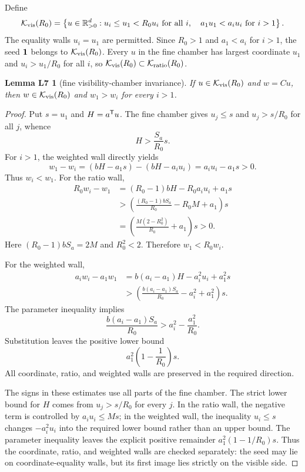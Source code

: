 \documentclass[11pt,letterpaper]{article}
\theoremstyle{plain}
\newtheorem*{lemLseven}{Lemma L7}
\begin{document}
Define
\[
\mathcal{K}_{\mathrm{vis}}(R_0)=\left\{u\in\mathbb R_{>0}^d:
u_i\leq u_1<R_0u_i\ \text{for all }i,\quad
a_1u_1<a_i u_i\ \text{for }i>1\right\}.
\]
The equality walls $u_i=u_1$ are permitted.  Since $R_0>1$ and $a_1<a_i$ for $i>1$, the seed $\mathbf{1}$ belongs to $\mathcal{K}_{\mathrm{vis}}(R_0)$.  Every $u$ in the fine chamber has largest coordinate $u_1$ and $u_i>u_1/R_0$ for all $i$, so $\mathcal{K}_{\mathrm{vis}}(R_0)\subset\mathcal{K}_{\mathrm{ratio}}(R_0)$.

\begin{lemLseven}[fine visibility-chamber invariance]
If $u\in\mathcal{K}_{\mathrm{vis}}(R_0)$ and $w=Cu$, then $w\in\mathcal{K}_{\mathrm{vis}}(R_0)$ and $w_1>w_i$ for every $i>1$.
\end{lemLseven}

\begin{proof}
Put $s=u_1$ and $H=a^{\mathsf{T}}u$.  The fine chamber gives $u_j\leq s$ and $u_j>s/R_0$ for all $j$, whence
\[
H>\frac{S_a}{R_0}s.
\]
For $i>1$, the weighted wall directly yields
\[
w_1-w_i=(bH-a_1s)-(bH-a_i u_i)=a_i u_i-a_1s>0.
\]
Thus $w_i<w_1$.  For the ratio wall,
\begin{align*}
R_0w_i-w_1
&=(R_0-1)bH-R_0a_i u_i+a_1s\\
&>\left(\frac{(R_0-1)bS_a}{R_0}-R_0M+a_1\right)s\\
&=\left(\frac{M(2-R_0^2)}{R_0}+a_1\right)s>0.
\end{align*}
Here $(R_0-1)bS_a=2M$ and $R_0^2<2$.  Therefore $w_1<R_0w_i$.

For the weighted wall,
\begin{align*}
a_iw_i-a_1w_1
&=b(a_i-a_1)H-a_i^2u_i+a_1^2s\\
&>\left(\frac{b(a_i-a_1)S_a}{R_0}-a_i^2+a_1^2\right)s.
\end{align*}
The parameter inequality implies
\[
\frac{b(a_i-a_1)S_a}{R_0}>a_i^2-\frac{a_1^2}{R_0}.
\]
Substitution leaves the positive lower bound
\[
a_1^2\left(1-\frac1{R_0}\right)s.
\]
All coordinate, ratio, and weighted walls are preserved in the required direction.

The signs in these estimates use all parts of the fine chamber.  The strict lower bound for \(H\) comes from \(u_j>s/R_0\) for every \(j\).  In the ratio wall, the negative term is controlled by \(a_i u_i\leq Ms\); in the weighted wall, the inequality \(u_i\leq s\) changes \(-a_i^2u_i\) into the required lower bound rather than an upper bound.  The parameter inequality leaves the explicit positive remainder \(a_1^2(1-1/R_0)s\).  Thus the coordinate, ratio, and weighted walls are checked separately: the seed may lie on coordinate-equality walls, but its first image lies strictly on the visible side.
\end{proof}
\end{document}
